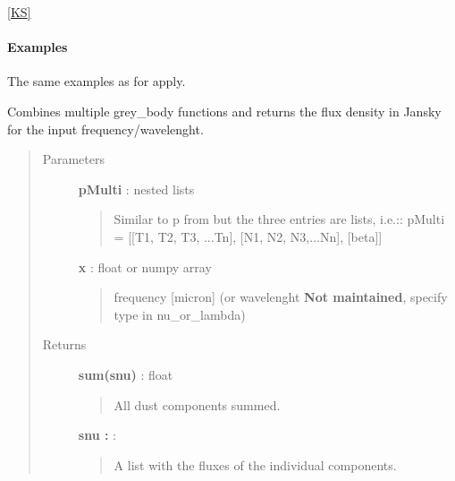 \documentclass[a4paper,10pt,english]{sphinxmanual}
\begin{document}
\begin{fulllineitems}
{\hyperref[functions:ks]{{[}KS{]}}}
\paragraph{Examples}

The same examples as for {\hyperref[functions:astrolyze.functions.astro_functions.black_body]{}} apply.

\end{fulllineitems}


\begin{fulllineitems}
\label{functions:astrolyze.functions.astro_functions.multi_component_grey_body}
Combines multiple grey\_body functions and returns the flux density in
Jansky for the input frequency/wavelenght.
\begin{quote}\begin{description}
\item[{Parameters }] \leavevmode
\textbf{pMulti} : nested lists
\begin{quote}

Similar to p from
{\hyperref[functions:astrolyze.functions.astro_functions.grey_body]{}} but the three entries are
lists, i.e.::
pMulti = {[}{[}T1, T2, T3, ...Tn{]}, {[}N1, N2, N3,...Nn{]}, {[}beta{]}{]}
\end{quote}

\textbf{x} : float or numpy array
\begin{quote}

frequency {[}micron{]} (or wavelenght \textbf{Not maintained}, specify type in
nu\_or\_lambda)
\end{quote}

\item[{Returns }] \leavevmode
\textbf{sum(snu)} : float
\begin{quote}

All dust components summed.
\end{quote}

\textbf{snu :} :
\begin{quote}

A list with the fluxes of the individual components.
\end{quote}


\end{description}
\end{quote}
\end{fulllineitems}
\end{document}

